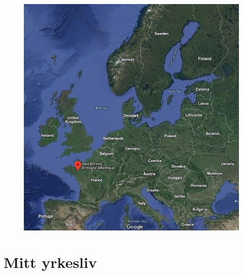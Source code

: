 \begin{frame}
\begin{figure}
{    \includegraphics[height=0.4\textheight]{fig/inria-map.png}}
  \end{figure}
\end{frame}

\section{Mitt yrkesliv}


